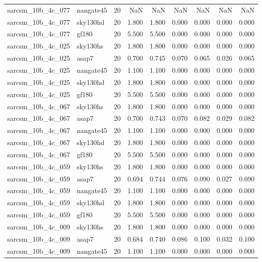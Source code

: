 \begin{tabular}{llrrrrrrr}
sarcsm\_10b\_4c\_077 & nangate45 & 20 & NaN & NaN & NaN & NaN & NaN & NaN \\
sarcsm\_10b\_4c\_077 & sky130hd & 20 & 1.800 & 1.800 & 0.000 & 0.000 & 0.000 & 0.000 \\
sarcsm\_10b\_4c\_077 & gf180 & 20 & 5.500 & 5.500 & 0.000 & 0.000 & 0.000 & 0.000 \\
sarcsm\_10b\_4c\_025 & sky130hs & 20 & 1.800 & 1.800 & 0.000 & 0.000 & 0.000 & 0.000 \\
sarcsm\_10b\_4c\_025 & asap7 & 20 & 0.700 & 0.745 & 0.070 & 0.065 & 0.026 & 0.065 \\
sarcsm\_10b\_4c\_025 & nangate45 & 20 & 1.100 & 1.100 & 0.000 & 0.000 & 0.000 & 0.000 \\
sarcsm\_10b\_4c\_025 & sky130hd & 20 & 1.800 & 1.800 & 0.000 & 0.000 & 0.000 & 0.000 \\
sarcsm\_10b\_4c\_025 & gf180 & 20 & 5.500 & 5.500 & 0.000 & 0.000 & 0.000 & 0.000 \\
sarcsm\_10b\_4c\_067 & sky130hs & 20 & 1.800 & 1.800 & 0.000 & 0.000 & 0.000 & 0.000 \\
sarcsm\_10b\_4c\_067 & asap7 & 20 & 0.700 & 0.743 & 0.070 & 0.082 & 0.029 & 0.082 \\
sarcsm\_10b\_4c\_067 & nangate45 & 20 & 1.100 & 1.100 & 0.000 & 0.000 & 0.000 & 0.000 \\
sarcsm\_10b\_4c\_067 & sky130hd & 20 & 1.800 & 1.800 & 0.000 & 0.000 & 0.000 & 0.000 \\
sarcsm\_10b\_4c\_067 & gf180 & 20 & 5.500 & 5.500 & 0.000 & 0.000 & 0.000 & 0.000 \\
sarcsm\_10b\_4c\_059 & sky130hs & 20 & 1.800 & 1.800 & 0.000 & 0.000 & 0.000 & 0.000 \\
sarcsm\_10b\_4c\_059 & asap7 & 20 & 0.694 & 0.744 & 0.076 & 0.090 & 0.027 & 0.090 \\
sarcsm\_10b\_4c\_059 & nangate45 & 20 & 1.100 & 1.100 & 0.000 & 0.000 & 0.000 & 0.000 \\
sarcsm\_10b\_4c\_059 & sky130hd & 20 & 1.800 & 1.800 & 0.000 & 0.000 & 0.000 & 0.000 \\
sarcsm\_10b\_4c\_059 & gf180 & 20 & 5.500 & 5.500 & 0.000 & 0.000 & 0.000 & 0.000 \\
sarcsm\_10b\_4c\_009 & sky130hs & 20 & 1.800 & 1.800 & 0.000 & 0.000 & 0.000 & 0.000 \\
sarcsm\_10b\_4c\_009 & asap7 & 20 & 0.684 & 0.740 & 0.086 & 0.100 & 0.032 & 0.100 \\
sarcsm\_10b\_4c\_009 & nangate45 & 20 & 1.100 & 1.100 & 0.000 & 0.000 & 0.000 & 0.000 \\

\end{tabular}
